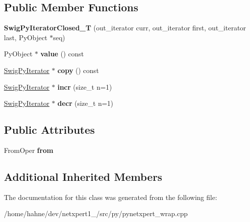 \subsection*{Public Member Functions}
\begin{DoxyCompactItemize}
\item 
{\bfseries Swig\+Py\+Iterator\+Closed\+\_\+T} (out\+\_\+iterator curr, out\+\_\+iterator first, out\+\_\+iterator last, Py\+Object $\ast$seq)\hypertarget{classswig_1_1SwigPyIteratorClosed__T_ae23b1da812fe9a789dcbc18b4db5ffe9}{}\label{classswig_1_1SwigPyIteratorClosed__T_ae23b1da812fe9a789dcbc18b4db5ffe9}

\item 
Py\+Object $\ast$ {\bfseries value} () const \hypertarget{classswig_1_1SwigPyIteratorClosed__T_afd8db79726af8529b1f08667ad664c32}{}\label{classswig_1_1SwigPyIteratorClosed__T_afd8db79726af8529b1f08667ad664c32}

\item 
\hyperlink{structswig_1_1SwigPyIterator}{Swig\+Py\+Iterator} $\ast$ {\bfseries copy} () const \hypertarget{classswig_1_1SwigPyIteratorClosed__T_abc73769c7f3877651cf13cf8f5389b5f}{}\label{classswig_1_1SwigPyIteratorClosed__T_abc73769c7f3877651cf13cf8f5389b5f}

\item 
\hyperlink{structswig_1_1SwigPyIterator}{Swig\+Py\+Iterator} $\ast$ {\bfseries incr} (size\+\_\+t n=1)\hypertarget{classswig_1_1SwigPyIteratorClosed__T_a1bf667d0f643064b452ecb2fc5e48df2}{}\label{classswig_1_1SwigPyIteratorClosed__T_a1bf667d0f643064b452ecb2fc5e48df2}

\item 
\hyperlink{structswig_1_1SwigPyIterator}{Swig\+Py\+Iterator} $\ast$ {\bfseries decr} (size\+\_\+t n=1)\hypertarget{classswig_1_1SwigPyIteratorClosed__T_aafae78acb63a1c4acaf2a76d4e9f6267}{}\label{classswig_1_1SwigPyIteratorClosed__T_aafae78acb63a1c4acaf2a76d4e9f6267}

\end{DoxyCompactItemize}
\subsection*{Public Attributes}
\begin{DoxyCompactItemize}
\item 
From\+Oper {\bfseries from}\hypertarget{classswig_1_1SwigPyIteratorClosed__T_a8a87b95d1e7e7d0784866dc71189575d}{}\label{classswig_1_1SwigPyIteratorClosed__T_a8a87b95d1e7e7d0784866dc71189575d}

\end{DoxyCompactItemize}
\subsection*{Additional Inherited Members}


The documentation for this class was generated from the following file\+:\begin{DoxyCompactItemize}
\item 
/home/hahne/dev/netxpert1\+\_/src/py/pynetxpert\+\_\+wrap.\+cpp\end{DoxyCompactItemize}
